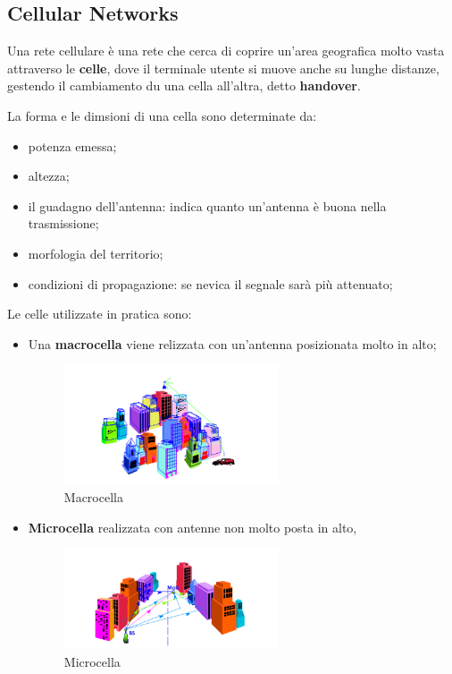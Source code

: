 \documentclass[12pt]{article}
\begin{document}
\subsection{Cellular Networks}
Una rete cellulare \`e una rete che cerca di coprire un'area geografica molto vasta attraverso le \textbf{celle}, dove il terminale utente si muove anche su lunghe distanze, gestendo il cambiamento du una cella all'altra, detto \textbf{handover}.

La forma e le dimsioni di una cella sono determinate da:
\begin{itemize}
    \item potenza emessa;
    \item altezza;
    \item il guadagno dell'antenna: indica quanto un'antenna \`e buona nella trasmissione;
    \item morfologia del territorio;
    \item condizioni di propagazione: se nevica il segnale sar\`a pi\`u attenuato;
\end{itemize}
Le celle utilizzate in pratica sono:
\begin{itemize}
    \item Una \textbf{macrocella} viene relizzata con un'antenna posizionata molto in alto;
    \begin{figure}[H]
        \centering
        \includegraphics[width=0.6\textwidth]{macrocella.png}
        \caption{Macrocella}
        \label{fig:macrocella}
    \end{figure}
    \item \textbf{Microcella} realizzata con antenne non molto posta in alto,
    \begin{figure}[H]
        \centering
        \includegraphics[width=0.6\textwidth]{microcella.png}
        \caption{Microcella}
        \label{fig:microcella}
    \end{figure}
\end{itemize}
\end{document}
